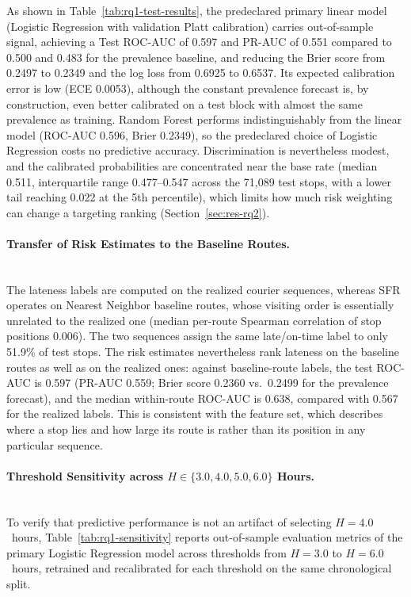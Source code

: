 \documentclass[11pt,a4paper]{article}
\begin{document}
As shown in Table~\ref{tab:rq1-test-results}, the predeclared primary linear model (Logistic Regression with validation Platt calibration) carries out-of-sample signal, achieving a Test ROC-AUC of 0.597 and PR-AUC of 0.551 compared to 0.500 and 0.483 for the prevalence baseline, and reducing the Brier score from 0.2497 to 0.2349 and the log loss from 0.6925 to 0.6537. Its expected calibration error is low (ECE 0.0053), although the constant prevalence forecast is, by construction, even better calibrated on a test block with almost the same prevalence as training. Random Forest performs indistinguishably from the linear model (ROC-AUC 0.596, Brier 0.2349), so the predeclared choice of Logistic Regression costs no predictive accuracy. Discrimination is nevertheless modest, and the calibrated probabilities are concentrated near the base rate (median 0.511, interquartile range 0.477--0.547 across the 71,089 test stops, with a lower tail reaching 0.022 at the 5th percentile), which limits how much risk weighting can change a targeting ranking (Section~\ref{sec:res-rq2}).

\paragraph{Transfer of Risk Estimates to the Baseline Routes.}\mbox{}\\
The lateness labels are computed on the realized courier sequences, whereas SFR operates on Nearest Neighbor baseline routes, whose visiting order is essentially unrelated to the realized one (median per-route Spearman correlation of stop positions 0.006). The two sequences assign the same late/on-time label to only 51.9\% of test stops. The risk estimates nevertheless rank lateness on the baseline routes as well as on the realized ones: against baseline-route labels, the test ROC-AUC is 0.597 (PR-AUC 0.559; Brier score 0.2360 vs.\ 0.2499 for the prevalence forecast), and the median within-route ROC-AUC is 0.638, compared with 0.567 for the realized labels. This is consistent with the feature set, which describes where a stop lies and how large its route is rather than its position in any particular sequence.

\paragraph{Threshold Sensitivity across $H \in \{3.0, 4.0, 5.0, 6.0\}$ Hours.}\mbox{}\\
To verify that predictive performance is not an artifact of selecting $H = 4.0$~hours, Table~\ref{tab:rq1-sensitivity} reports out-of-sample evaluation metrics of the primary Logistic Regression model across thresholds from $H = 3.0$ to $H = 6.0$~hours, retrained and recalibrated for each threshold on the same chronological split.
\end{document}
